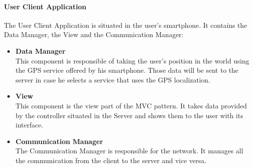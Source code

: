\documentclass[titlepage]{article}
\begin{document}
\paragraph{\textbf{User Client Application}}
The User Client Application is situated in the user's smartphone. It contains the Data Manager, the View and the Communication Manager:
\begin{itemize}
\item \textbf{Data Manager}\\
This component is responsible of taking the user's position in the world using the GPS service offered by his smartphone. Those data will be sent to the server in case he selects a service that uses the GPS localization. \\
\item \textbf{View}\\
This component is the view part of the MVC pattern. It takes data provided by the controller situated in the Server and shows them to the user with its interface.
\item \textbf{Communication Manager}\\
The Communication Manager is responsible for the network.
It manages all the communication from the client to the server and vice versa.\\
\end{itemize}
\end{document}
